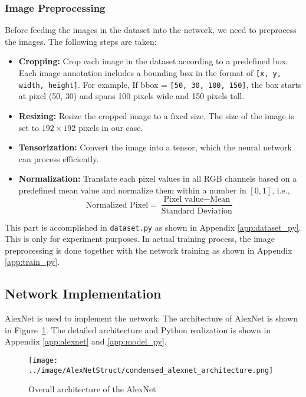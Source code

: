 \documentclass[a4paper,12pt]{article}
\begin{document}
\subsubsection{Image Preprocessing}

Before feeding the images in the dataset into the network, we need to preprocess the images. The following steps are taken:

\begin{itemize}
	\item \textbf{Cropping:} Crop each image in the dataset according to a predefined box. Each image annotation includes a bounding box in the format of \texttt{[x, y, width, height]}. For example, If bbox = \texttt{[50, 30, 100, 150]}, the box starts at pixel (50, 30) and spans 100 pixels wide and 150 pixels tall.
	\item \textbf{Resizing:} Resize the cropped image to a fixed size. The size of the image is set to $192\times192$ pixels in our case.
	\item \textbf{Tensorization:} Convert the image into a tensor, which the neural network can process efficiently.
	\item \textbf{Normalization:} Translate each pixel values in all RGB channels based on a predefined mean value and normalize them within a number in $[0,1]$, i.e.,
	$$
	\text{Normalized Pixel} = \frac{\text{Pixel value} - \text{Mean}}{\text{Standard Deviation}}
	$$
\end{itemize}

This part is accomplished in \texttt{dataset.py} as shown in Appendix \ref{app:dataset_py}. This is only for experiment purposes. In actual training process, the image preprocessing is done together with the network training as shown in Appendix \ref{app:train_py}.

\subsection{Network Implementation}
\label{sec:network_implementation}

AlexNet is used to implement the network. The architecture of AlexNet is shown in Figure~\ref{fig:alexnet}. The detailed architecture and Python realization is shown in Appendix \ref{app:alexnet} and \ref{app:model_py}.

\begin{figure}[h!]
	\centering
	\texttt{[image: ../image/AlexNetStruct/condensed\_alexnet\_architecture.png]}
	\caption{Overall architecture of the AlexNet}
	\label{fig:alexnet}
\end{figure}
\end{document}
